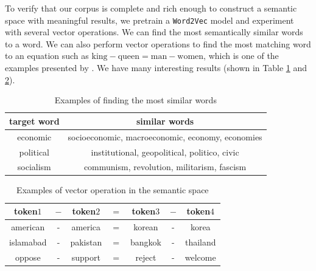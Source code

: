 \documentclass[final,authoryear,3p,12pt,times,hidelinks]{elsarticle}
\begin{document}
To verify that our corpus is complete and rich enough to construct a semantic space with meaningful results, we pretrain a \texttt{Word2Vec} model and experiment with several vector operations. We can find the most semantically similar words to a word. We can also perform vector operations to find the most matching word to an equation such as $\text{king} - \text{queen} = \text{man} - \text{women}$, which is one of the examples presented by \cite{mikolov2013efficient}. We have many interesting results (shown in Table \ref{tab:word2vec similar words} and \ref{tab:word2vec operations}). 

\begin{table}[ht!]
  \centering
  \caption{Examples of finding the most similar words}
  \begin{tabular}{c c} 
  \hline
  target word & similar words \\
  \hline 
  economic & socioeconomic, macroeconomic, economy, economies \\

  political & institutional, geopolitical, politico, civic \\

  socialism & communism, revolution, militarism, fascism \\
  \hline
  \end{tabular}
  \label{tab:word2vec similar words}
\end{table}

\begin{table}[!ht]
  \centering
  \caption{Examples of vector operation in the semantic space}
  \begin{tabular}{c c c c c c c} 
  \hline
  token$1$ & $-$ & token$2$ & $=$ & token$3$ & $-$ & token$4$\\
  \hline
  american & - & america & = & korean & - & korea \\ 
  
  islamabad & - & pakistan & = & bangkok & - & thailand \\
  
  oppose & - & support & = & reject & - & welcome \\
  \hline
 \end{tabular}
 \label{tab:word2vec operations}
\end{table}
\end{document}
